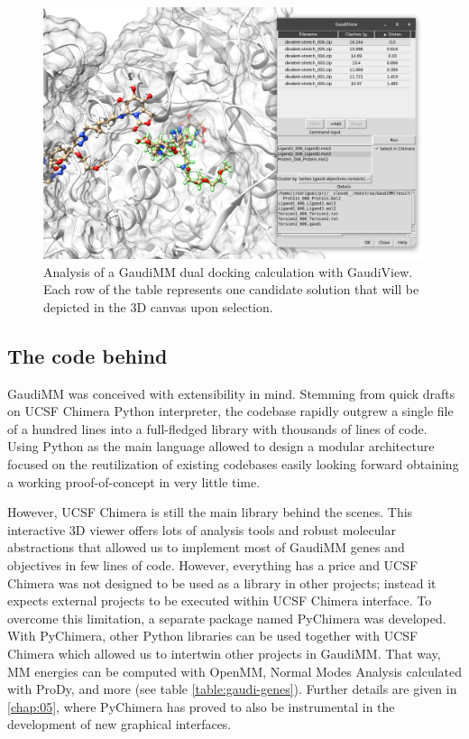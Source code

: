 \begin{figure}[H]
	\includegraphics[width=\textwidth]{./figures/04/gaudiview.png}
	\caption[GaudiView]{Analysis of a GaudiMM dual docking calculation with GaudiView. Each row of the table represents one candidate solution that will be depicted in the 3D canvas upon selection.}
	\label{fig:gaudiview}
\end{figure}


\subsection{The code behind}
GaudiMM was conceived with extensibility in mind. Stemming from quick drafts on UCSF Chimera Python interpreter, the codebase rapidly outgrew a single file of a hundred lines into a full-fledged library with thousands of lines of code. Using Python as the main language allowed to design a modular architecture focused on the reutilization of existing codebases easily looking forward obtaining a working proof-of-concept in very little time.

However, UCSF Chimera is still the main library behind the scenes. This interactive 3D viewer offers lots of analysis tools and robust molecular abstractions that allowed us to implement most of GaudiMM genes and objectives in few lines of code. However, everything has a price and UCSF Chimera was not designed to be used as a library in other projects; instead it expects external projects to be executed within UCSF Chimera interface. To overcome this limitation, a separate package named PyChimera was developed. With PyChimera, other Python libraries can be used together with UCSF Chimera which allowed us to intertwin other projects in GaudiMM. That way, MM energies can be computed with OpenMM, Normal Modes Analysis calculated with ProDy, and more (see table \ref{table:gaudi-genes}). Further details are given in \autoref{chap:05}, where PyChimera has proved to also be instrumental in the development of new graphical interfaces.


